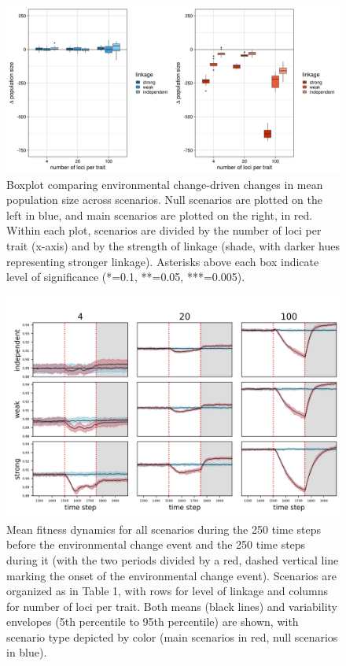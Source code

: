 \documentclass[9pt,twocolumn,twoside,lineno]{pnas-new}
\begin{document}
\begin{figure}
\centering
\includegraphics[width=11.4cm]{Nt_boxplot.jpg}
\caption{Boxplot comparing environmental change-driven changes in mean population size across scenarios. Null scenarios are plotted on the left in blue, and main scenarios are plotted on the right, in red. Within each plot, scenarios are divided by the number of loci per trait (x-axis) and by the strength of linkage (shade, with darker hues representing stronger linkage). Asterisks above each box indicate level of significance (*=0.1, **=0.05, ***=0.005).}
\label{fig:Nt_boxplot}
\end{figure}

\begin{figure}
\centering
\includegraphics[width=11.4cm]{fit_over_time.jpg}
\caption{Mean fitness dynamics for all scenarios during the 250 time steps before the environmental change event and the 250 time steps during it (with the two periods divided by a red, dashed vertical line marking the onset of the environmental change event). Scenarios are organized as in Table 1, with rows for level of linkage and columns for number of loci per trait. Both means (black lines) and variability envelopes (5th percentile to 95th percentile) are shown, with scenario type depicted by color (main scenarios in red, null scenarios in blue).}
\label{fig:fit_over_time}
\end{figure}
\end{document}
